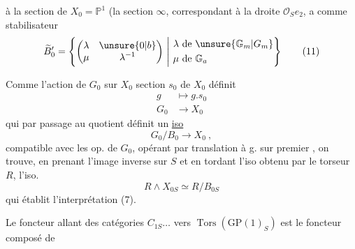 à la section   de  $X_0=\mathbb P^1$ (la section $\infty$, correspondant à la droite $\mathcal O_S e_2$, a comme stabilisateur
\[
\widetilde B'_0=\left\{\begin{pmatrix}\lambda&\unsure{0|b}\\ \mu&\lambda^{-1}\end{pmatrix}\ \middle|\ 
\begin{aligned}\lambda&\ \text{de }\unsure{\mathbb G_m|G_m}\\ \mu&\ \text{de }\mathbb G_a\end{aligned}\right\} \tag*{(11)}
\]

Comme l'action de $G_0$ sur $X_0$  section $s_0$ de $X_0$ définit
\[
\begin{aligned}g&\longmapsto g.s_0\\G_0&\longrightarrow X_0\end{aligned}\tag*{(12)}
\]
qui par passage au quotient définit un \uline{iso}
\[
G_0/B_0\longrightarrow X_0\ ,\tag*{(13)}
\]
 compatible avec les op. de $G_0$, opérant par translation à g. sur  premier , on trouve, en prenant l'image inverse sur $S$ et en tordant l'iso obtenu par le torseur $R$, l'iso.
\[
R\wedge X_{0S}\simeq R/B_{0S}\tag*{(14)}
\]
qui établit l'interprétation (7).

Le foncteur allant des  catégories $C_{1S}\ldots$ vers $\operatorname{Tors}(\mathrm{GP}(1)_S)$ est le foncteur composé de
